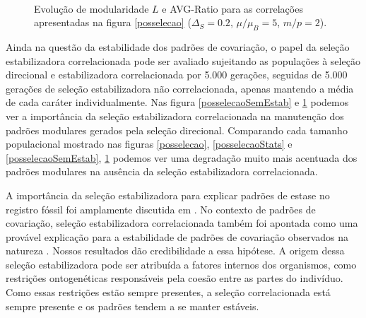 \begin{figure}[htbp]
  \vspace{-18pt}
  \vspace{11pt}
  \\
  \caption{Evolução de modularidade $L$ e AVG-Ratio para as correlações
     apresentadas na figura \ref{posselecao} ($\Delta_S = 0.2$, $\mu/\mu_B=5$, $m/p=2$).}
  \label{posselecaoSemEstabStats}
\end{figure}


Ainda na questão da estabilidade dos padrões de covariação, o papel da
seleção estabilizadora correlacionada pode ser avaliado sujeitando as
populações à seleção direcional e estabilizadora correlacionada por 5.000
gerações, seguidas de 5.000 gerações de seleção estabilizadora não
correlacionada, apenas mantendo a média de cada caráter individualmente.
Nas figura \ref{posselecaoSemEstab} e \ref{posselecaoSemEstabStats}
podemos ver a importância da seleção estabilizadora correlacionada na
manutenção dos padrões modulares gerados pela seleção direcional. 
Comparando cada tamanho populacional mostrado nas figuras
\ref{posselecao}, \ref{posselecaoStats} e \ref{posselecaoSemEstab},
\ref{posselecaoSemEstabStats} podemos ver uma degradação muito mais
acentuada dos padrões modulares na ausência da seleção
estabilizadora correlacionada. 

A importância da seleção estabilizadora para explicar padrões de estase
no registro fóssil foi amplamente discutida em \cite{Charlesworth1982a}.
No contexto de padrões de covariação, seleção estabilizadora
correlacionada também foi apontada como uma provável explicação para a
estabilidade de padrões de covariação observados na natureza
\citep{Cheverud1984, Marroig2001, Porto2009}. 
Nossos resultados dão credibilidade a essa hipótese. 
A origem dessa seleção estabilizadora pode ser atribuída a fatores
internos dos organismos, como restrições ontogenéticas responsáveis pela
coesão entre as partes do indivíduo. 
Como essas restrições estão sempre presentes, a seleção correlacionada
está sempre presente e os padrões tendem a se manter estáveis. 

